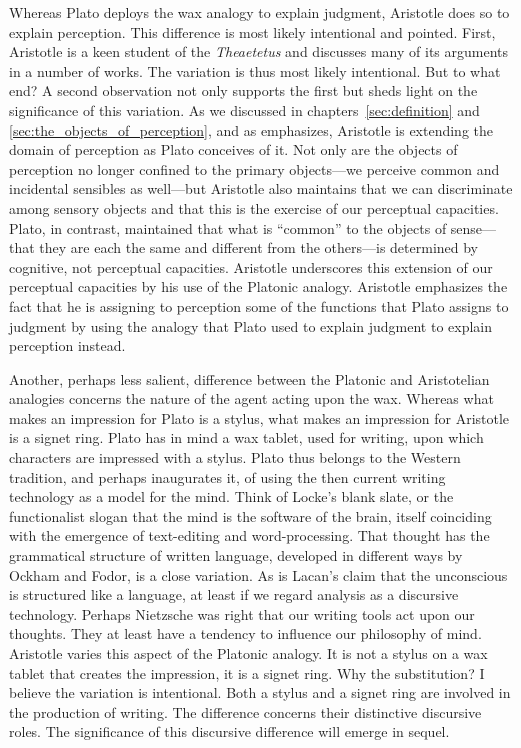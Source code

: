 Whereas Plato deploys the wax analogy to explain judgment, Aristotle does so to explain perception. This difference is most likely intentional and pointed. First, Aristotle is a keen student of the \emph{Theaetetus} and discusses many of its arguments in a number of works. The variation is thus most likely intentional. But to what end? A second observation not only supports the first but sheds light on the significance of this variation. As we discussed in chapters~\ref{sec:definition} and \ref{sec:the_objects_of_perception}, and as \citet{Sorabji:1971fr,Sorabji:2003fk} emphasizes, Aristotle is extending the domain of perception as Plato conceives of it. Not only are the objects of perception no longer confined to the primary objects---we perceive common and incidental sensibles as well---but Aristotle also maintains that we can discriminate among sensory objects and that this is the exercise of our perceptual capacities. Plato, in contrast, maintained that what is ``common'' to the objects of sense---that they are each the same and different from the others---is determined by cognitive, not perceptual capacities. Aristotle underscores this extension of our perceptual capacities by his use of the Platonic analogy. Aristotle emphasizes the fact that he is assigning to perception some of the functions that Plato assigns to judgment by using the analogy that Plato used to explain judgment to explain perception instead.

Another, perhaps less salient, difference between the Platonic and Aristotelian analogies concerns the nature of the agent acting upon the wax. Where\-as what makes an impression for Plato is a stylus, what makes an impression for Aristotle is a signet ring. Plato has in mind a wax tablet, used for writing, upon which characters are impressed with a stylus. Plato thus belongs to the Western tradition, and perhaps inaugurates it, of using the then current writing technology as a model for the mind. Think of Locke's blank slate, or the functionalist slogan that the mind is the software of the brain, itself coinciding with the emergence of text-editing and word-processing. That thought has the grammatical structure of written language, developed in different ways by Ockham and Fodor, is a close variation. As is Lacan's claim that the unconscious is structured like a language, at least if we regard analysis as a discursive technology. Perhaps Nietzsche was right that our writing tools act upon our thoughts. They at least have a tendency to influence our philosophy of mind. Aristotle varies this aspect of the Platonic analogy. It is not a stylus on a wax tablet that creates the impression, it is a signet ring. Why the substitution? I believe the variation is intentional. Both a stylus and a signet ring are involved in the production of writing. The difference concerns their distinctive discursive roles. The significance of this discursive difference will emerge in sequel. 

